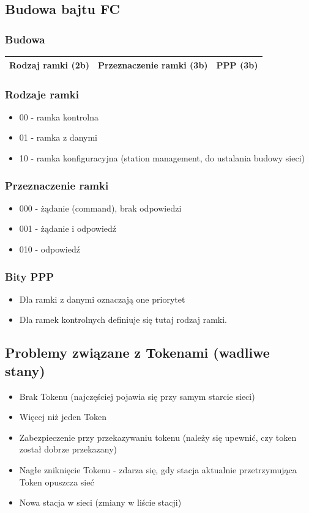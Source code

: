 			\subsection{Budowa bajtu FC}
				\subsubsection{Budowa}
					\begin{tabular}{|c|c|c|}
						\hline Rodzaj ramki (2b) & Przeznaczenie ramki (3b) & PPP (3b) \\ 
						\hline 
					\end{tabular} 
				\subsubsection{Rodzaje ramki}
					\begin{itemize}
						\item 00 - ramka kontrolna
						\item 01 - ramka  z danymi
						\item 10 - ramka konfiguracyjna (station management, do ustalania budowy sieci)
					\end{itemize}
				\subsubsection{Przeznaczenie ramki}
					\begin{itemize}
						\item 000 - żądanie (command), brak odpowiedzi
						\item 001 - żądanie i odpowiedź
						\item 010 - odpowiedź
					\end{itemize}
				\subsubsection{Bity PPP}
					\begin{itemize}
						\item Dla ramki z danymi oznaczają one priorytet
						\item Dla ramek kontrolnych definiuje się tutaj rodzaj ramki. 
					\end{itemize}
			\subsection{Problemy związane z Tokenami (wadliwe stany)}
			\begin{itemize}
				\item Brak Tokenu (najczęściej pojawia się przy samym starcie sieci) 
				\item Więcej niż jeden Token
				\item Zabezpieczenie przy przekazywaniu tokenu (należy się upewnić, czy token został dobrze przekazany)
				\item Nagłe zniknięcie Tokenu - zdarza się, gdy stacja aktualnie przetrzymująca Token opuszcza sieć
				\item Nowa stacja w sieci (zmiany w liście stacji)
			\end{itemize}
